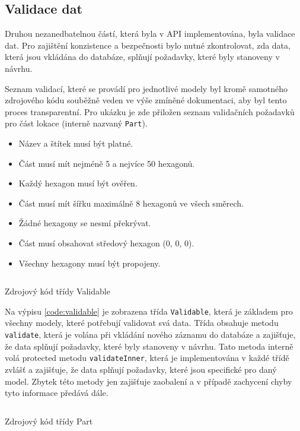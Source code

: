 \subsection{Validace dat}
\label{subsec:validation}

Druhou nezanedbatelnou částí, která byla v API implementována, byla validace dat. Pro zajištění konzistence a bezpečnosti bylo nutné zkontrolovat, zda data, která jsou vkládána do databáze, splňují požadavky, které byly stanoveny v návrhu.

Seznam validací, které se provádí pro jednotlivé modely byl kromě samotného zdrojového kódu souběžně veden ve výše zmíněné dokumentaci, aby byl tento proces transparentní. Pro ukázku je zde přiložen seznam validačních požadavků pro část lokace (interně nazvaný \texttt{Part}).

\begin{itemize}
    \setlength\itemsep{0.5mm}
    \item Název a štítek musí být platné.
    \item Část musí mít nejméně 5 a nejvíce 50 hexagonů.
    \item Každý hexagon musí být ověřen.
    \item Část musí mít šířku maximálně 8 hexagonů ve všech směrech.
    \item Žádné hexagony se nesmí překrývat.
    \item Část musí obsahovat středový hexagon (0, 0, 0).
    \item Všechny hexagony musí být propojeny.
\end{itemize}

\begin{listing}[h]
    \inputminted{Java}{code/Validable.java}
    \caption{Zdrojový kód třídy Validable}
    \label{code:validable}
\end{listing}

Na výpisu \ref{code:validable} je zobrazena třída \texttt{Validable}, která je základem pro všechny modely, které potřebují validovat svá data. Třída obsahuje metodu \texttt{validate}, která je volána při vkládání nového záznamu do databáze a zajišťuje, že data splňují požadavky, které byly stanoveny v návrhu. Tato metoda interně volá protected metodu \texttt{validateInner}, která je implementována v každé třídě zvlášť a zajišťuje, že data splňují požadavky, které jsou specifické pro daný model. Zbytek této metody jen zajišťuje zaobalení a v případě zachycení chyby tyto informace předává dále.

\begin{listing}[h]
    \inputminted{Java}{code/Part.java}
    \caption{Zdrojový kód třídy Part}
    \label{code:part}
\end{listing}

